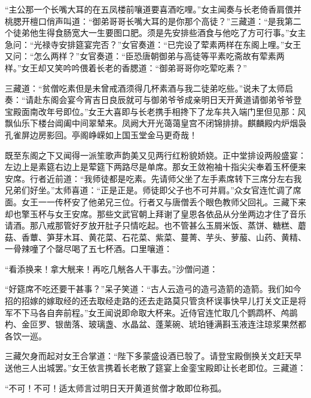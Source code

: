 \documentclass[12pt,UTF8]{ctexbook}
\begin{document}
“主公那一个长嘴大耳的在五凤楼前嚷道要喜酒吃哩。”女主闻奏与长老倚香肩偎并桃腮开檀口俏声叫道：“御弟哥哥长嘴大耳的是你那个高徒？”三藏道：“是我第二个徒弟他生得食肠宽大一生要图口肥。须是先安排些酒食与他吃了方可行事。”女主急问：“光禄寺安排筵宴完否？”女官奏道：“已完设了荤素两样在东阁上哩。”女王又问：“怎么两样？”女官奏道：“臣恐唐朝御弟与高徒等平素吃斋故有荤素两样。”女王却又笑吟吟偎着长老的香腮道：“御弟哥哥你吃荤吃素？”

三藏道：“贫僧吃素但是未曾戒酒须得几杯素酒与我二徒弟吃些。”说未了太师启奏：“请赴东阁会宴今宵吉日良辰就可与御弟爷爷成亲明日天开黄道请御弟爷爷登宝殿面南改年号即位。”女王大喜即与长老携手相搀下了龙车共入端门里但见那：风飘仙乐下楼台阊阖中间翠辇来。凤阙大开光蔼蔼皇宫不闭锦排排。麒麟殿内炉烟袅孔雀屏边房影回。亭阁峥嵘如上国玉堂金马更奇哉！

既至东阁之下又闻得一派笙歌声韵美又见两行红粉貌娇娆。正中堂排设两般盛宴：左边上是素筵右边上是荤筵下两路尽是单席。那女王敛袍袖十指尖尖奉着玉杯便来安席。行者近前道：“我师徒都是吃素。先请师父坐了左手素席转下三席分左右我兄弟们好坐。”太师喜道：“正是正是。师徒即父子也不可并肩。”众女官连忙调了席面。女王一一传杯安了他弟兄三位。行者又与唐僧丢个眼色教师父回礼。三藏下来却也擎玉杯与女王安席。那些文武官朝上拜谢了皇恩各依品从分坐两边才住了音乐请酒。那八戒那管好歹放开肚子只情吃起。也不管甚么玉屑米饭、蒸饼、糖糕、蘑菇、香蕈、笋芽木耳、黄花菜、石花菜、紫菜、蔓菁、芋头、萝菔、山药、黄精、一骨辣噇了个罄尽喝了五七杯酒。口里嚷道：

“看添换来！拿大觥来！再吃几觥各人干事去。”沙僧问道：

“好筵席不吃还要干甚事？”呆子笑道：“古人云造弓的造弓造箭的造箭。我们如今招的招嫁的嫁取经的还去取经走路的还去走路莫只管贪杯误事快早儿打关文正是将军不下马各自奔前程。”女王闻说即命取大杯来。近侍官连忙取几个鹦鹉杯、鸬鹚杓、金叵罗、银凿落、玻璃盏、水晶盆、蓬莱碗、琥珀锺满斟玉液连注琼浆果然都各饮一巡。

三藏欠身而起对女王合掌道：“陛下多蒙盛设酒已彀了。请登宝殿倒换关文赶天早送他三人出城罢。”女王依言携着长老散了筵宴上金銮宝殿即让长老即位。三藏道：

“不可！不可！适太师言过明日天开黄道贫僧才敢即位称孤。
\end{document}
